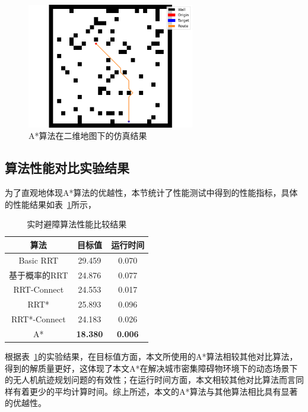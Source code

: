 \begin{figure}[!htbp]
    \centering
    \includegraphics[width=0.65\textwidth]{images/test_8_A_Star.png}
    \caption{A*算法在二维地图下的仿真结果}
    \label{fig:A*算法在二维地图下的仿真结果}
\end{figure}

\subsection{算法性能对比实验结果}

为了直观地体现A*算法的优越性，本节统计了性能测试中得到的性能指标，具体的性能结果如表~\ref{tab:实时避障算法性能比较结果}所示，

\begin{longtable}{c c c}
    \caption{实时避障算法性能比较结果}
    \label{tab:实时避障算法性能比较结果}\\
        \toprule
        \textbf{算法} & \textbf{目标值} & \textbf{运行时间} \\
        \midrule
        Basic RRT & 29.459 & 0.070 \\
        基于概率的RRT & 24.876 & 0.077 \\
        RRT-Connect & 24.553 & 0.017 \\
        RRT* & 25.893 & 0.096 \\
        RRT*-Connect & 24.183 & 0.026 \\
        A* & \textbf{18.380} & \textbf{0.006} \\
        \bottomrule
\end{longtable}

根据表~\ref{tab:实时避障算法性能比较结果}的实验结果，在目标值方面，本文所使用的A*算法相较其他对比算法，得到的解质量更好，这体现了本文A*在解决城市密集障碍物环境下的动态场景下的无人机航迹规划问题的有效性；在运行时间方面，本文相较其他对比算法而言同样有着更少的平均计算时间。综上所述，本文的A*算法与其他算法相比具有显著的优越性。

